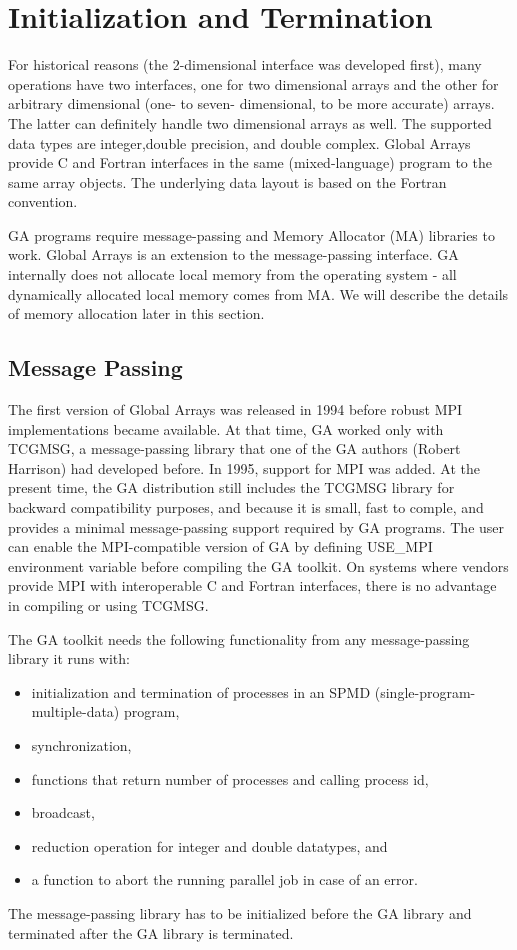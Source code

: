 \chapter{\label{sec:Initialization-and-Termination}Initialization and Termination}

For historical reasons (the 2-dimensional interface was developed
first), many operations have two interfaces, one for two dimensional
arrays and the other for arbitrary dimensional (one- to seven- dimensional,
to be more accurate) arrays. The latter can definitely handle two
dimensional arrays as well. The supported data types are integer,double
precision, and double complex. Global Arrays provide C and Fortran
interfaces in the same (mixed-language) program to the same array
objects. The underlying data layout is based on the Fortran convention.

GA programs require message-passing and Memory Allocator (MA) libraries
to work. Global Arrays is an extension to the message-passing interface.
GA internally does not allocate local memory from the operating system
- all dynamically allocated local memory comes from MA. We will describe
the details of memory allocation later in this section. 


\section{Message Passing }

The first version of Global Arrays was released in 1994 before robust
MPI implementations became available. At that time, GA worked only
with TCGMSG, a message-passing library that one of the GA authors
(Robert Harrison) had developed before. In 1995, support for MPI was
added. At the present time, the GA distribution still includes the
TCGMSG library for backward compatibility purposes, and because it
is small, fast to comple, and provides a minimal message-passing support
required by GA programs. The user can enable the MPI-compatible version
of GA by defining USE\_MPI environment variable before compiling the
GA toolkit. On systems where vendors provide MPI with interoperable
C and Fortran interfaces, there is no advantage in compiling or using
TCGMSG.

The GA toolkit needs the following functionality from any message-passing
library it runs with:
\begin{itemize}
\item initialization and termination of processes in an SPMD (single-program-multiple-data)
program, 
\item synchronization, 
\item functions that return number of processes and calling process id, 
\item broadcast, 
\item reduction operation for integer and double datatypes, and 
\item a function to abort the running parallel job in case of an error.
\end{itemize}
The message-passing library has to be initialized before the GA library
and terminated after the GA library is terminated.

